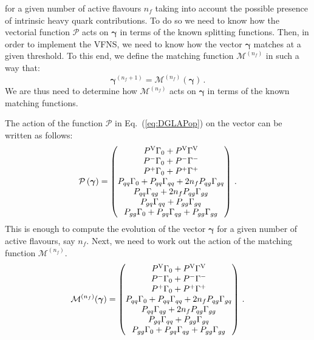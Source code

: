 \documentclass[10pt,a4paper]{article}
\begin{document}
for a given number of active flavours $n_f$ taking into account the
possible presence of intrinsic heavy quark contributions. To do so we
need to know how the vectorial function $\mathcal{P}$ acts on
${\bm \gamma}$ in terms of the known splitting functions. Then, in
order to implement the VFNS, we need to know how the vector
${\bm \gamma}$ matches at a given threshold. To this end, we define
the matching function $\mathcal{M}^{(n_f)}$ in such a way that:
\begin{equation}
  {\bm \gamma}^{(n_f+1)}=\mathcal{M}^{(n_f)}({\bm \gamma})\,.
\end{equation}
We are thus need to determine how $\mathcal{M}^{(n_f)}$ acts on
${\bm \gamma}$ in terms of the known matching functions.

The action of the function $\mathcal{P}$ in Eq.~(\ref{eq:DGLAPop}) on
the vector can be written as follows:
\begin{equation}
\mathcal{P}\left({\bm \gamma}\right) =
\begin{pmatrix}
P^{\rm V}\Gamma_0 +P^{\rm V}\Gamma^{\rm V}\\
P^-\Gamma_0 +P^-\Gamma^-\\
P^+\Gamma_0 +P^+\Gamma^+\\
P_{qq}\Gamma_0+P_{qq}\Gamma_{qq}+2n_fP_{qg}\Gamma_{gq}\\
P_{qq}\Gamma_{qg}+2n_fP_{qg}\Gamma_{gg}\\
P_{gq}\Gamma_{qq}+P_{gg}\Gamma_{gq}\\
P_{gg}\Gamma_0+P_{gq}\Gamma_{qg}+P_{gg}\Gamma_{gg}
\end{pmatrix}\,.
\end{equation}
This is enough to compute the evolution of the vector ${\bm \gamma}$
for a given number of active flavours, say $n_f$. Next, we need to
work out the action of the matching function $\mathcal{M}^{(n_f)}$.
\begin{equation}
\mathcal{M}^{(n_f)}({\bm \gamma}) =
\begin{pmatrix}
P^{\rm V}\Gamma_0 +P^{\rm V}\Gamma^{\rm V}\\
P^-\Gamma_0 +P^-\Gamma^-\\
P^+\Gamma_0 +P^+\Gamma^+\\
P_{qq}\Gamma_0+P_{qq}\Gamma_{qq}+2n_fP_{qg}\Gamma_{gq}\\
P_{qq}\Gamma_{qg}+2n_fP_{qg}\Gamma_{gg}\\
P_{gq}\Gamma_{qq}+P_{gg}\Gamma_{gq}\\
P_{gg}\Gamma_0+P_{gq}\Gamma_{qg}+P_{gg}\Gamma_{gg}
\end{pmatrix}\,.
\end{equation}
\end{document}
